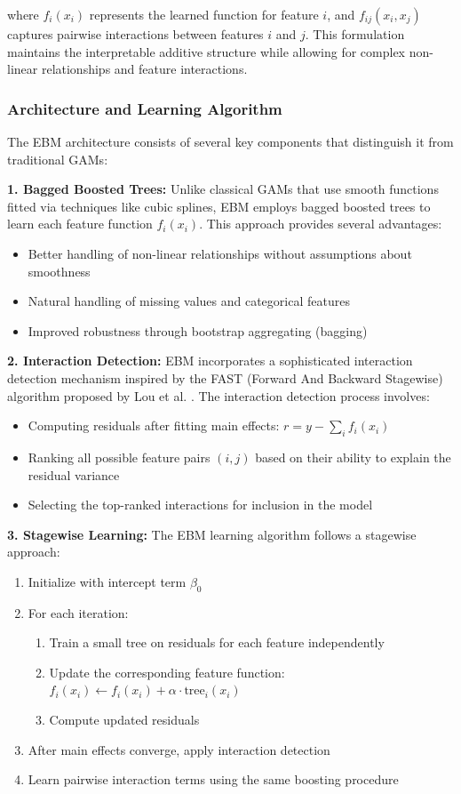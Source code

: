 \documentclass[12pt]{article}
\begin{document}
where $f_i(x_i)$ represents the learned function for feature $i$, and $f_{ij}(x_i, x_j)$ captures pairwise interactions between features $i$ and $j$. This formulation maintains the interpretable additive structure while allowing for complex non-linear relationships and feature interactions.

\subsubsection{Architecture and Learning Algorithm}

The EBM architecture consists of several key components that distinguish it from traditional GAMs:

\textbf{1. Bagged Boosted Trees:} Unlike classical GAMs that use smooth functions fitted via techniques like cubic splines, EBM employs bagged boosted trees to learn each feature function $f_i(x_i)$. This approach provides several advantages:
\begin{itemize}
\item Better handling of non-linear relationships without assumptions about smoothness
\item Natural handling of missing values and categorical features
\item Improved robustness through bootstrap aggregating (bagging)
\end{itemize}

\textbf{2. Interaction Detection:} EBM incorporates a sophisticated interaction detection mechanism inspired by the FAST (Forward And Backward Stagewise) algorithm proposed by Lou et al. \cite{lou2013}. The interaction detection process involves:
\begin{itemize}
\item Computing residuals after fitting main effects: $r = y - \sum_{i} f_i(x_i)$
\item Ranking all possible feature pairs $(i,j)$ based on their ability to explain the residual variance
\item Selecting the top-ranked interactions for inclusion in the model
\end{itemize}

\textbf{3. Stagewise Learning:} The EBM learning algorithm follows a stagewise approach:
\begin{enumerate}
\item Initialize with intercept term $\beta_0$
\item For each iteration:
  \begin{enumerate}
  \item Train a small tree on residuals for each feature independently
  \item Update the corresponding feature function: $f_i(x_i) \leftarrow f_i(x_i) + \alpha \cdot \text{tree}_i(x_i)$
  \item Compute updated residuals
  \end{enumerate}
\item After main effects converge, apply interaction detection
\item Learn pairwise interaction terms using the same boosting procedure
\end{enumerate}
\end{document}
